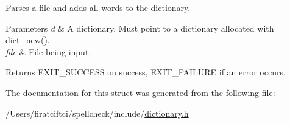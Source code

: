 Parses a file and adds all words to the dictionary. 


\begin{DoxyParams}{Parameters}
{\em d} & A dictionary. Must point to a dictionary allocated with \mbox{\hyperlink{structdict__t_a0074913fdba65680670bf93153225e2f}{dict\+\_\+new()}}. \\
\hline
{\em file} & File being input. \\
\hline
\end{DoxyParams}
\begin{DoxyReturn}{Returns}
E\+X\+I\+T\+\_\+\+S\+U\+C\+C\+E\+SS on success, E\+X\+I\+T\+\_\+\+F\+A\+I\+L\+U\+RE if an error occurs. 
\end{DoxyReturn}


The documentation for this struct was generated from the following file\+:\begin{DoxyCompactItemize}
\item 
/\+Users/firatciftci/spellcheck/include/\mbox{\hyperlink{dictionary_8h}{dictionary.\+h}}\end{DoxyCompactItemize}
